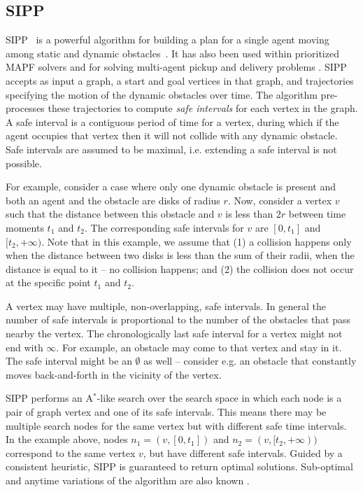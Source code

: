 \documentclass[review]{elsarticle}
\newcommand{\sipp}{\ac{SIPP}\xspace}
\newcommand{\astar}{A$^*$\xspace}
\newcommand{\mapf}{\ac{MAPF}\xspace}
\begin{document}
\subsection{\sipp}
\sipp~\cite{phillips2011sipp} is a powerful algorithm for building a plan for a single agent moving among static and dynamic obstacles~\cite{phillips2011sipp}. 
It has also been used within prioritized \mapf solvers \cite{yakovlev2017anyAngle} and for solving multi-agent pickup and delivery problems \cite{ma2019lifelong}. 
\sipp accepts as input a graph, a start and goal vertices in that graph, and trajectories specifying the motion of the dynamic obstacles over time. 
The algorithm pre-processes these trajectories to compute \emph{safe intervals} for each vertex in the graph. 
A safe interval is a contiguous period of time for a vertex, during which if the agent occupies that vertex then it will not collide with any dynamic obstacle. 
Safe intervals are assumed to be maximal, i.e. extending a safe interval is not possible.

For example, consider a case where only one dynamic obstacle is present and both an agent and the obstacle are disks of radius $r$.
Now, consider a vertex $v$ such that the distance between this obstacle and $v$ is less than $2r$ between time moments $t_1$ and $t_2$. The corresponding safe intervals for $v$ are $[0, t_1]$ and $[t_2, +\infty)$.
Note that in this example, we assume that (1) a collision happens only when the distance between two disks is less than the sum of their radii, when the distance is equal to it -- no collision happens; and (2) the collision does not occur at the specific point $t_1$ and $t_2$.

A vertex may have multiple, non-overlapping, safe intervals. 
In general the number of safe intervals is proportional to the number of the obstacles that pass nearby the vertex. The chronologically last safe interval for a vertex might not end with $\infty$. For example, an obstacle may come to that vertex and stay in it. The safe interval might be an $\emptyset$ as well -- consider e.g. an obstacle that constantly moves back-and-forth in the vicinity of the vertex. 



\sipp performs an \astar-like search over the search space in which each node is a pair of graph vertex and one of its safe intervals. This means there may be multiple search nodes for the same vertex but with different safe time intervals. In the example above, nodes
$n_1=(v, [0, t_1])$ and $n_2=(v, [t_2, +\infty) )$ 
correspond to the same vertex $v$, but have different safe intervals.
Guided by a consistent heuristic, \sipp is guaranteed to return optimal solutions. 
Sub-optimal and anytime variations of the algorithm are also known \cite{narayanan2012anytime,yakovlev2020revisiting}. %
\end{document}
